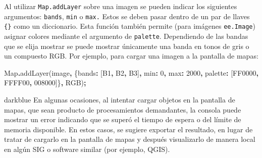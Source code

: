 \documentclass[
  12pt,
  letterpaper,
  twoside]{book}
\newenvironment{Shaded}{\begin{snugshade}}{\end{snugshade}}
\newcommand{\BuiltInTok}[1]{#1}
\newcommand{\DataTypeTok}[1]{\textcolor[rgb]{0.13,0.29,0.53}{#1}}
\newcommand{\DecValTok}[1]{\textcolor[rgb]{0.00,0.00,0.81}{#1}}
\newcommand{\FunctionTok}[1]{\textcolor[rgb]{0.00,0.00,0.00}{#1}}
\newcommand{\NormalTok}[1]{#1}
\newcommand{\OperatorTok}[1]{\textcolor[rgb]{0.81,0.36,0.00}{\textbf{#1}}}
\newcommand{\StringTok}[1]{\textcolor[rgb]{0.31,0.60,0.02}{#1}}
\begin{document}
Al utilizar \texttt{Map.addLayer} sobre una imagen se pueden indicar los siguientes argumentos: \texttt{bands}, \texttt{min} o \texttt{max.} Estos se deben pasar dentro de un par de llaves \texttt{\{\}} como un diccionario. Esta función también permite (para imágenes \texttt{ee.Image}) asignar colores mediante el argumento de \texttt{palette}. Dependiendo de las bandas que se elija mostrar se puede mostrar únicamente una banda en tonos de gris o un compuesto RGB. Por ejemplo, para cargar una imagen a la pantalla de mapas:

\begin{Shaded}
\begin{Highlighting}[]
\BuiltInTok{Map}\OperatorTok{.}\FunctionTok{addLayer}\NormalTok{(image}\OperatorTok{,}\NormalTok{ \{}\DataTypeTok{bands}\OperatorTok{:}\NormalTok{ [}\StringTok{\textquotesingle{}B1\textquotesingle{}}\OperatorTok{,} \StringTok{\textquotesingle{}B2\textquotesingle{}}\OperatorTok{,} \StringTok{\textquotesingle{}B3\textquotesingle{}}\NormalTok{]}\OperatorTok{,} 
                      \DataTypeTok{min}\OperatorTok{:} \DecValTok{0}\OperatorTok{,} \DataTypeTok{max}\OperatorTok{:} \DecValTok{2000}\OperatorTok{,} 
                      \DataTypeTok{palette}\OperatorTok{:}\NormalTok{ [}\StringTok{\textquotesingle{}FF0000\textquotesingle{}}\OperatorTok{,} \StringTok{\textquotesingle{}FFFF00\textquotesingle{}}\OperatorTok{,}\StringTok{\textquotesingle{} 008000\textquotesingle{}}\NormalTok{]\}}\OperatorTok{,} 
                      \StringTok{\textquotesingle{}RGB\textquotesingle{}}\NormalTok{)}\OperatorTok{;}
\end{Highlighting}
\end{Shaded}

\begin{bluebox2}

\begin{awesomeblock}{5pt}{\faLightbulb}{darkblue}
En algunas ocasiones, al intentar cargar objetos en la pantalla de mapas, que sean producto de procesamientos demandantes, la consola puede mostrar un error indicando que se superó el tiempo de espera o del límite de memoria disponible. En estos casos, se sugiere exportar el resultado, en lugar de tratar de cargarlo en la pantalla de mapas y después visualizarlo de manera local en algún SIG o software similar (por ejemplo, QGIS).

\end{awesomeblock}

\end{bluebox2}
\end{document}
